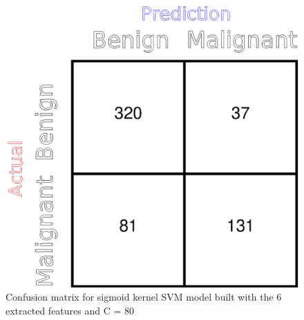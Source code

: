 \documentclass[twoside]{iitbreport}
\begin{document}
\begin{figure}[]
  \begin{center}
    \includegraphics[trim={9cm 0cm 0cm 0cm},clip,scale=0.8]{Figures/KSVM_Sigmoid_CM}
  \end{center}
  \caption{Confusion matrix for sigmoid kernel SVM model built with the 6 extracted features and C = 80}
  \label{KSVMSigmoidCM}
\end{figure}


     
\end{document}
